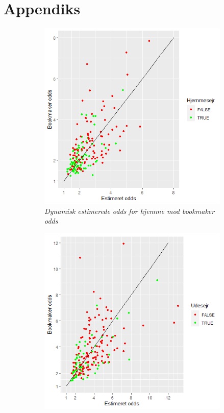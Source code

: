 \documentclass[11pt,a4paper]{article}
\begin{document}
\section{Appendiks}
\begin{figure}[h!]
  \centering
  \begin{subfigure}[b]{0.4\textwidth}
    \includegraphics[width=\textwidth]{DynHjemmeOdds.png}
    \caption{\textit{Dynamisk estimerede odds for hjemme mod bookmaker odds}}
    \label{fig:DynHjemmeOdds}
  \end{subfigure}
    \hspace{0.2cm}
  \begin{subfigure}[b]{0.4\linewidth}
    \includegraphics[width=\textwidth]{DynUdeOdds.png}

\end{subfigure}
\end{figure}
\end{document}
